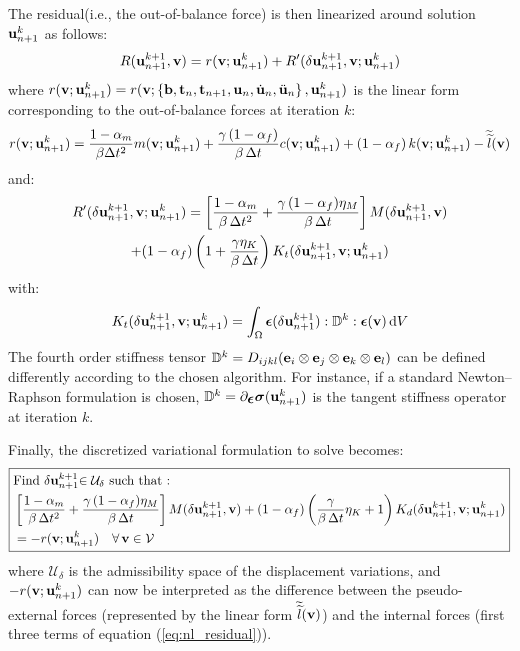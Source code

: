 \documentclass{report}
\newcommand{\bb}{\textbf{b}}
\newcommand{\bu}{\textbf{u}}
\newcommand{\bv}{\textbf{v}}
\newcommand{\bt}{\boldsymbol t}
\def\bepsilon{\mbox{\boldmath${\epsilon}$}}
\def\bsigma{\mbox{\boldmath${\sigma}$}}
\def\bb{{\bf{b}}}
\def\be{{\bf e}}
\def\be{{\bf{e}}}
\def\bt{{\bf t}}
\def\bu{{\bf{u}}}
\def\bv{{\bf{v}}}
\begin{document}
The residual(i.e., the out-of-balance force) is then linearized around solution ${\bu_{n+1}^{k}}$
as follows:
\begin{equation}
R({\bu_{n+1}^{k+1}},\bv)=r(\bv;\bu_{n+1}^{k})+R'(\delta{\bu_{n+1}^{k+1}},\bv;\bu_{n+1}^{k})\label{eq:linearization_1-1}
\end{equation}
where $r(\bv;\bu_{n+1}^{k})=r(\bv;\left\{ \bb,\bt_{n},\bt_{n+1},\bu_{n},\dot{\bu}_{n},\ddot{\bu}_{n}\right\} ,\bu_{n+1}^{k})$
is the linear form corresponding to the out-of-balance forces at iteration
$k$:
\begin{equation}
r(\bv;\bu_{n+1}^{k})=\frac{1-\alpha_{m}}{\beta\Delta t^{2}}m(\bv;\bu_{n+1}^{k})+\frac{\gamma\,(1-\alpha_{f})}{\beta\,\Delta t}c(\bv;\bu_{n+1}^{k})+\left(1-\alpha_{f}\right)k(\bv;\bu_{n+1}^{k})-\widetilde{\widetilde{l}}(\bv)\label{eq:nl_residual}
\end{equation}
and:
\begin{multline}
R'(\delta{\bu_{n+1}^{k+1}},\bv;\bu_{n+1}^{k})= \left[ \frac{1-\alpha_{m}}{\beta\,\Delta t^{2}}+ \frac{\gamma\,(1-\alpha_{f})\eta_M}{\beta\,\Delta t}  \right] M(\delta{\bu_{n+1}^{k+1}},\bv) \\ + (1-\alpha_{f})\left(1+\frac{\gamma\eta_{K}}{\beta\,\Delta t}\right)K_{t}(\delta{\bu_{n+1}^{k+1}},\bv;\bu_{n+1}^{k})\label{eq:linearization_1}
\end{multline}
with:
\begin{equation}
K_{t}(\delta{\bu_{n+1}^{k+1}},\bv;\bu_{n+1}^{k})=\int_{\Omega}\bepsilon(\delta{\bu_{n+1}^{k+1}}):\mathbb{D}^{k}:\bepsilon(\bv)\,{\rm d}V
\end{equation}
The fourth order stiffness tensor $\mathbb{D}^{k}=D_{ijkl}(\be_{i}\otimes\be_{j}\otimes\be_{k}\otimes\be_{l})$
can be defined differently according to the chosen algorithm. For
instance, if a standard Newton--Raphson formulation is chosen, $\mathbb{D}^{k}=\partial_{\bepsilon}\bsigma({\bu_{n+1}^{k}})$
is the tangent stiffness operator at iteration $k$.

Finally, the discretized variational formulation to solve becomes:
\begin{equation}
\boxed{\begin{aligned} & \text{Find \ensuremath{\delta{\bu_{n+1}^{k+1}}}\ensuremath{\in\mathcal{U}_{\delta}} such that : }\\
 & \left[ \frac{1-\alpha_{m}}{\beta\,\Delta t^{2}}+ \frac{\gamma\,(1-\alpha_{f})\eta_M}{\beta\,\Delta t}  \right] M(\delta{\bu_{n+1}^{k+1}},\bv) + (1-\alpha_{f})\left(\frac{\gamma}{\beta\,\Delta t}\eta_{K}+1\right)K_{d}(\delta{\bu_{n+1}^{k+1}},\bv;\bu_{n+1}^{k}) \\ & =-r(\bv;\bu_{n+1}^{k})\quad\text{\ensuremath{\forall\,}}\bv\in\mathcal{V}
\end{aligned}
}
\end{equation}
where $\mathcal{U}_{\delta}$ is the admissibility space of the displacement
variations, and $-r(\bv;\bu_{n+1}^{k})$ can now be interpreted as
the difference between the pseudo-external forces (represented by the linear form $\widetilde{\widetilde{l}}(\bv)$)
and the internal forces (first three terms of equation (\ref{eq:nl_residual})).
\end{document}
